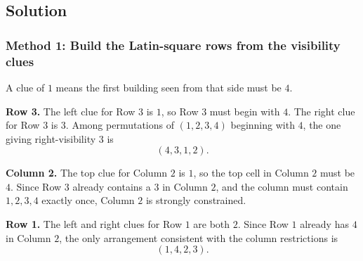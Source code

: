 \documentclass[12pt]{article}
\begin{document}
\begin{center}
\end{center}

\subsection{Solution}
\subsubsection{Method 1: Build the Latin-square rows from the visibility clues}
A clue of $1$ means the first building seen from that side must be $4$.

\noindent \textbf{Row 3.}
The left clue for Row $3$ is $1$, so Row $3$ must begin with $4$. The right clue for Row $3$ is $3$. Among permutations of $(1,2,3,4)$ beginning with $4$, the one giving right-visibility $3$ is
\[
(4,3,1,2).
\]

\noindent \textbf{Column 2.}
The top clue for Column $2$ is $1$, so the top cell in Column $2$ must be $4$. Since Row $3$ already contains a $3$ in Column $2$, and the column must contain $1,2,3,4$ exactly once, Column $2$ is strongly constrained.

\noindent \textbf{Row 1.}
The left and right clues for Row $1$ are both $2$. Since Row $1$ already has $4$ in Column $2$, the only arrangement consistent with the column restrictions is
\[
(1,4,2,3).
\]
\end{document}
